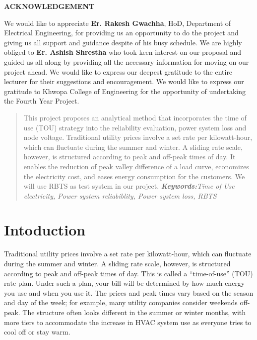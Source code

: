 \documentclass[12pt]{article}
\begin{document}
\begin{center}
\textbf{ACKNOWLEDGEMENT}
\end{center}
\bigskip
We would like to appreciate \textbf{Er. Rakesh Gwachha}, HoD, Department of Electrical
Engineering, for providing us an opportunity to do the project and giving us all support and guidance despite of his busy schedule. We are highly obliged to \textbf{ Er. Ashish Shrestha}  who took keen interest on our proposal and guided us all along by providing all the necessary information for moving on our project ahead. We would like to express our deepest gratitude to the entire lecturer for their suggestions and encouragement. We would like to express our gratitude to Khwopa College of Engineering for the opportunity of undertaking the Fourth Year Project.
\pagebreak
\begin{abstract}
\bigskip
This project proposes an analytical method that incorporates the time of use
(TOU) strategy into the reliability evaluation, power system loss and node voltage.
Traditional utility prices involve a set rate per kilowatt-hour, which can fluctuate during the summer and winter. A sliding rate scale, however, is structured
according to peak and off-peak times of day. It enables the reduction of peak valley difference of a load curve, economizes the electricity cost, and eases energy
consumption for the customers. We will use RBTS as test system in our project.
\textit{\textbf{Keywords:}Time of Use electricity, Power system reliabiblity, Power system loss,
RBTS}
\end{abstract}
\pagebreak
\tableofcontents
\pagebreak
\listoffigures
\pagebreak
{}
\section{Intoduction}
Traditional utility prices involve a set rate per kilowatt-hour, which can fluctuate
during the summer and winter. A sliding rate scale, however, is structured according to peak and off-peak times of day. This is called a “time-of-use” (TOU) rate
plan. Under such a plan, your bill will be determined by how much energy you use
and when you use it. The prices and peak times vary based on the season and day
of the week; for example, many utility companies consider weekends off-peak.
The structure often looks different in the summer or winter months, with more
tiers to accommodate the increase in HVAC system use as everyone tries to cool
off or stay warm.
\pagebreak
\end{document}
